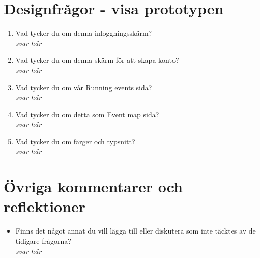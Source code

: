 \documentclass{article}
\begin{document}
\newpage
\section*{Designfrågor - visa prototypen}
\begin{enumerate}[label=\textbf{Fråga \arabic*:}]
    \item Vad tycker du om denna inloggningsskärm?\\
        \textit{svar här}
    \item Vad tycker du om denna skärm för att skapa konto?\\
        \textit{svar här}
    \item Vad tycker du om vår Running events sida?\\
        \textit{svar här}
    \item Vad tycker du om detta som Event map sida?\\
        \textit{svar här}
    \item Vad tycker du om färger och typsnitt?\\
        \textit{svar här}
\end{enumerate}

\section*{Övriga kommentarer och reflektioner}
\begin{itemize}[label=]
    \item Finns det något annat du vill lägga till eller diskutera som inte täcktes av de tidigare frågorna?\\
    \textit{svar här}
\end{itemize}
\thispagestyle{empty}
\end{document}

